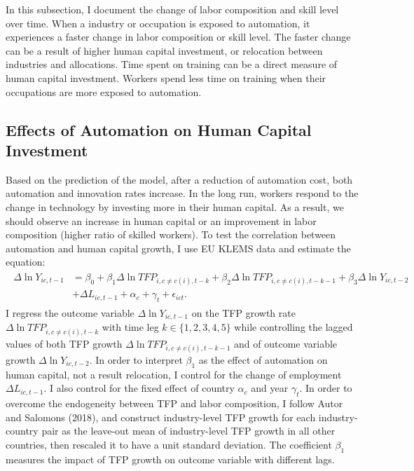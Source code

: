 \documentclass[12pt]{article}
\begin{document}
In this subsection, I document the change of labor composition and skill level over time. When a industry or occupation is exposed to automation, it experiences a faster change in labor composition or skill level. The faster change can be a result of higher human capital investment, or relocation between industries and allocations. Time spent on training can be a direct measure of human capital investment. Workers spend less time on training when their occupations are more exposed to automation. 

\subsection{Effects of Automation on Human Capital Investment}
Based on the prediction of the model, after a reduction of automation cost, both automation and innovation rates increase. In the long run, workers respond to the change in technology by investing more in their human capital. As a result, we should observe an increase in human capital or an improvement in labor composition (higher ratio of skilled workers). To test the correlation between automation and human capital growth, I use EU KLEMS data and estimate the equation:
\begin{align}
\begin{split}
 \Delta \ln Y_{i c, t-1} &=\beta_{0}+\beta_{1} \Delta \ln TFP_{i, c \neq c(i), t-k} +\beta_{2} \Delta \ln TFP_{i, c \neq c(i), t-k-1}+\beta_{3} \Delta \ln Y_{i c, t-2}\\
 &+\Delta L_{i c, t-1}+\alpha_{c}+\gamma_{t}+\epsilon_{ict}.
 \end{split}
\end{align}
I regress the outcome variable $\Delta \ln Y_{i c, t-1}$ on the TFP growth rate $\Delta \ln TFP_{i, c \neq c(i), t-k}$ with time leg $k \in \{1,2,3,4,5\}$ while controlling the lagged values of both TFP growth $\Delta \ln TFP_{i, c \neq c(i), t-k-1}$ and of outcome variable growth $\Delta \ln Y_{ic, t-2}$. In order to interpret $\beta_{1}$ as the effect of automation on human capital, not a result relocation, I control for the change of employment $\Delta L_{i c, t-1}$. I also control for the fixed effect of country $\alpha_{c}$ and year $\gamma_{t}$. In order to overcome the endogeneity between TFP and labor composition, I follow Autor and Salomons (2018)\nocite{AutorSalomons2018}, and construct industry-level TFP growth for each industry-country pair as the leave-out mean of industry-level TFP growth in all other countries, then rescaled it to have a unit standard deviation. The coefficient $\beta_{1}$ measures the impact of TFP growth on outcome variable with different lags. 
\end{document}
